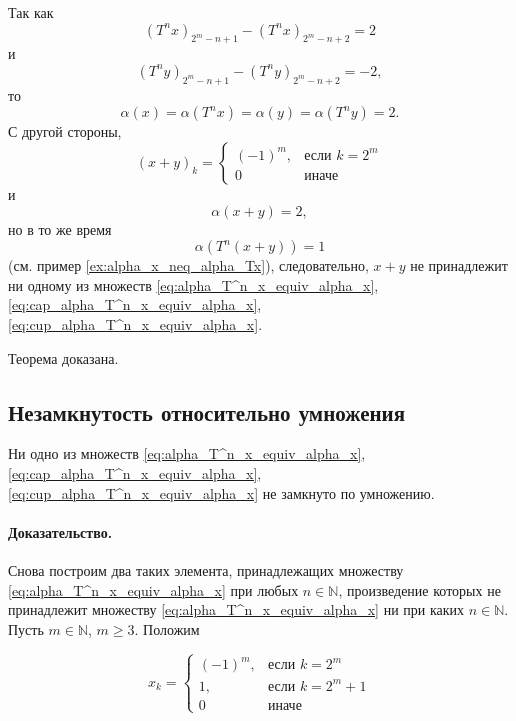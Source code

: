 Так как
\begin{equation}
	(T^n x)_{2^m-n+1} - (T^n x)_{2^m-n+2} = 2
\end{equation}
и
\begin{equation}
	(T^n y)_{2^m-n+1} - (T^n y)_{2^m-n+2} = -2
	,
\end{equation}
то
\begin{equation}
	\alpha(x) = \alpha(T^n x) = \alpha(y) = \alpha(T^n y) = 2
	.
\end{equation}
С другой стороны,
\begin{equation}
	(x+y)_k = \begin{cases}
		(-1)^m,  & \mbox{если } k = 2^m     \\
		0        & \mbox{иначе }
	\end{cases}
\end{equation}
и
\begin{equation}
	\alpha(x+y) = 2
	,
\end{equation}
но в то же время
\begin{equation}
	\alpha(T^n(x+y)) = 1
\end{equation}
(см. пример \ref{ex:alpha_x_neq_alpha_Tx}),
следовательно, $x+y$ не принадлежит ни одному из множеств
\eqref{eq:alpha_T^n_x_equiv_alpha_x}, \eqref{eq:cap_alpha_T^n_x_equiv_alpha_x}, \eqref{eq:cup_alpha_T^n_x_equiv_alpha_x}.

Теорема доказана.



\subsection{Незамкнутость относительно умножения}

\begin{theorem}
	Ни одно из множеств
	\eqref{eq:alpha_T^n_x_equiv_alpha_x}, \eqref{eq:cap_alpha_T^n_x_equiv_alpha_x}, \eqref{eq:cup_alpha_T^n_x_equiv_alpha_x}
	не замкнуто по умножению.
\end{theorem}

\paragraph{Доказательство.}
Снова построим два таких элемента, принадлежащих множеству \eqref{eq:alpha_T^n_x_equiv_alpha_x} при любых $n\in\mathbb{N}$,
произведение которых не принадлежит множеству \eqref{eq:alpha_T^n_x_equiv_alpha_x} ни при каких $n\in\mathbb{N}$.
Пусть $m\in\mathbb{N}$, $m \geq 3$.
Положим

\begin{equation}
	x_k = \begin{cases}
		(-1)^m,  & \mbox{если } k = 2^m     \\
		1,                   & \mbox{если } k = 2^m + 1 \\
		0                    & \mbox{иначе }
	\end{cases}
\end{equation}

